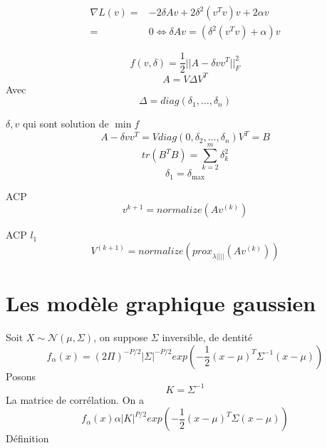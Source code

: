 \documentclass{article}
\begin{document}
\begin{equation}
\begin{split}
\nabla L(v)=&-2\delta Av+2\delta^2(v^Tv)v+2\alpha v\\
=&0 \Leftrightarrow \delta Av=(\delta^2(v^Tv)+\alpha)v
\end{split}
\end{equation}

\begin{equation}
f(v,\delta)=\frac{1}{2}||A-\delta vv^T||_F^2
\end{equation}
\begin{equation}
A=V\Delta V^T
\end{equation}
Avec 
\begin{equation}
\Delta=diag(\delta_1,\ldots,\delta_n)
\end{equation}

$\delta, v$ qui sont solution de $\min f$
\begin{equation}
A-\delta vv^T=Vdiag(0,\delta_2,\ldots,\delta_n)V^T=B
\end{equation}
\begin{equation}
tr(B^TB)=\sum_{k=2}^m\delta_k^2
\end{equation}
\begin{equation}
\delta_1=\delta_{\max}
\end{equation}

ACP
\begin{equation}
v^{k+1}=normalize(Av^{(k)})
\end{equation}

ACP $l_1$
\begin{equation}
V^{(k+1)}=normalize(prox_{\lambda||\dot||}(Av^{(k)}))
\end{equation}


\section{Les mod\`ele graphique gaussien}
Soit $X\sim\mathcal{N}(\mu,\Sigma)$, on suppose $\Sigma$ inversible, de dentit\'e
\begin{equation}
f_\alpha(x)=(2\Pi)^{-P/2}|\Sigma|^{-P/2}exp(-\frac{1}{2}(x-\mu)^T\Sigma^{-1}(x-\mu))
\end{equation}
Posons
\begin{equation}
K=\Sigma^{-1}
\end{equation}
La matrice de corr\'elation. On a
\begin{equation}
f_\alpha(x) \alpha |K|^{P/2}exp(-\frac{1}{2}(x-\mu)^T\Sigma(x-\mu))
\end{equation}
D\'efinition
\end{document}
